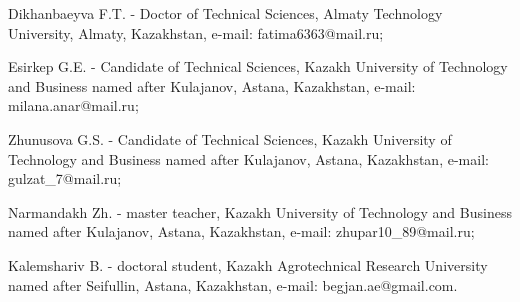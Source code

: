 \begin{noparindent}
Dikhanbaeyva F.T. - Doctor of Technical Sciences, Almaty Technology
University, Almaty, Kazakhstan, e-mail: fatima6363@mail.ru;

Esirkep G.E. - Candidate of Technical Sciences, Kazakh University of
Technology and Business named after Kulajanov, Astana, Kazakhstan,
e-mail: milana.anar@mail.ru;

Zhunusova G.S. - Candidate of Technical Sciences, Kazakh University of
Technology and Business named after Kulajanov, Astana, Kazakhstan,
e-mail: gulzat\_7@mail.ru;

Narmandakh Zh. - master teacher, Kazakh University of Technology and
Business named after Kulajanov, Astana, Kazakhstan, e-mail:
zhupar10\_89@mail.ru;

Kalemshariv B. - doctoral student, Kazakh Agrotechnical Research
University named after Seifullin, Astana, Kazakhstan, e-mail:
begjan.ae@gmail.com.
\end{noparindent}
